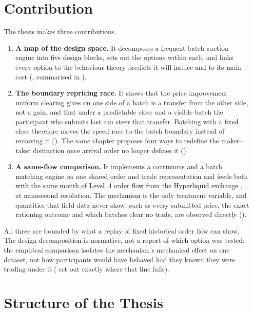 \section{Contribution}
\label{sec:contribution}

The thesis makes three contributions.

\begin{enumerate}
  \item \textbf{A map of the design space.} It decomposes a frequent batch
  auction engine into five design blocks, sets out the options within each,
  and links every option to the behaviour theory predicts it will induce and
  to its main cost (, summarised in ).
  \item \textbf{The boundary repricing race.} It shows that the price
  improvement uniform clearing gives on one side of a batch is a transfer
  from the other side, not a gain, and that under a predictable close and a
  visible batch the participant who submits last can steer that transfer.
  Batching with a fixed close therefore moves the speed race to the batch
  boundary instead of removing it (). The same
  chapter proposes four ways to redefine the maker--taker distinction once
  arrival order no longer defines it ().
  \item \textbf{A same-flow comparison.} It implements a continuous and a
  batch matching engine on one shared order and trade representation and
  feeds both with the same month of Level~4 order flow from the Hyperliquid
  exchange \citep{albers2026openbook}, at nanosecond resolution. The
  mechanism is the only treatment variable, and quantities that field data
  never show, such as every submitted price, the exact rationing outcome
  and which batches clear no trade, are observed directly
  ().
\end{enumerate}

All three are bounded by what a replay of fixed historical order
flow can show. The design decomposition is normative, not a report of
which option was tested; the empirical comparison isolates the
mechanism's mechanical effect on one dataset, not how participants would
have behaved had they known they were trading under it
( set out exactly where that
line falls).

\section{Structure of the Thesis}
\label{sec:structure}

